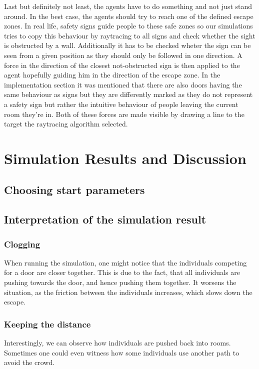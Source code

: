 \documentclass[11pt]{article}
\begin{document}
\begin{itemize}
    Last but definitely not least, the agents have to do something and not just stand around. In the best case, the agents should try to reach one of the defined escape zones. In real life, safety signs guide people to these safe zones so our simulations tries to copy this behaviour by raytracing to all signs and check whether the sight is obstructed by a wall. Additionally it has to be checked wheter the sign can be seen from a given position as they should only be followed in one direction. A force in the direction of the closest not-obstructed sign is then applied to the agent hopefully guiding him in the direction of the escape zone. In the implementation section it was mentioned that there are also doors having the same behaviour as signs but they are differently marked as they do not represent a safety sign but rather the intuitive behaviour of people leaving the current room they're in. Both of these forces are made visible by drawing a line to the target the raytracing algorithm selected.
\end{itemize}

\section{Simulation Results and Discussion}

\subsection{Choosing start parameters}

\subsection{Interpretation of the simulation result}

\subsubsection{Clogging}
    When running the simulation, one might notice that the individuals competing for a door are closer together. This is due to the fact, that all individuals are pushing towards the door, and hence pushing them together. It worsens the situation, as the friction between the individuals increases, which slows down the escape.  
    
\subsubsection{Keeping the distance}
    Interestingly, we can observe how individuals are pushed back into rooms. Sometimes one could even witness how some individuals use another path to avoid the crowd. 
\end{document}
